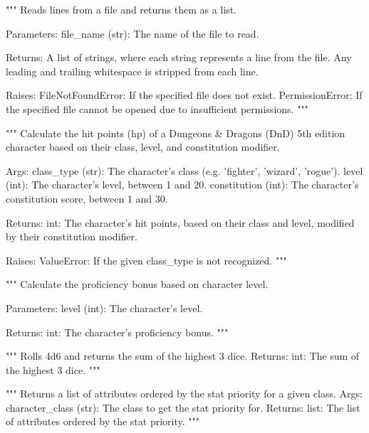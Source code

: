 \begin{codebox}
"""
Reads lines from a file and returns them as a list.

Parameters:
    file_name (str): The name of the file to read.

Returns:
    A list of strings, where each string represents a line from the file.
    Any leading and trailing whitespace is stripped from each line.

Raises:
    FileNotFoundError: If the specified file does not exist.
    PermissionError: If the specified file cannot be opened due to insufficient permissions.
"""
\end{codebox}

\begin{codebox}
"""
Calculate the hit points (hp) of a Dungeons & Dragons (DnD) 5th edition character
based on their class, level, and constitution modifier.

Args:
    class_type (str): The character's class (e.g. 'fighter', 'wizard', 'rogue').
    level (int): The character's level, between 1 and 20.
    constitution (int): The character's constitution score, between 1 and 30.

Returns:
    int: The character's hit points, based on their class and level, modified by their
       constitution modifier.

Raises:
    ValueError: If the given class_type is not recognized.
"""
\end{codebox}

\begin{codebox}
"""
Calculate the proficiency bonus based on character level.

Parameters:
    level (int): The character's level.

Returns:
    int: The character's proficiency bonus.
"""
\end{codebox}

\begin{codebox}
"""
Rolls 4d6 and returns the sum of the highest 3 dice.
Returns:
    int: The sum of the highest 3 dice.
"""
\end{codebox}

\begin{codebox}
"""
Returns a list of attributes ordered by the stat priority for a given class.
Args:
    character_class (str): The class to get the stat priority for.
Returns:
    list: The list of attributes ordered by the stat priority.
"""
\end{codebox}

